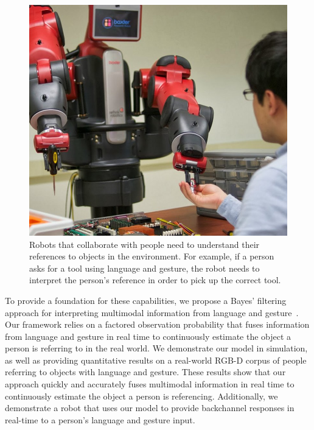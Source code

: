 \documentclass[letterpaper, 10 pt, conference]{ieeeconf}
\begin{document}
\begin{figure}
\centering
\includegraphics[width=1\linewidth]{figures/baxter_scene_cropped.jpg}
\caption{Robots that collaborate with people need to understand their
  references to objects in the environment.  For example, if a person
  asks for a tool using language and gesture, the robot needs to
  interpret the person's reference in order to pick up the correct
  tool.\label{fig:example}}
\end{figure}



To provide a foundation for these capabilities, we propose a Bayes'
filtering approach for interpreting multimodal information from
language and gesture~\citep{thrun08}.  Our framework relies on a
factored observation probability that fuses information from language
and gesture in real time to continuously estimate the object a person
is referring to in the real world.  We demonstrate our model in
simulation, as well as providing quantitative results on a real-world
RGB-D corpus of people referring to objects with language and gesture.
These results show that our approach quickly and accurately fuses
multimodal information in real time to continuously estimate the
object a person is referencing.  Additionally, we demonstrate a robot
that uses our model to provide backchannel responses in real-time to a
person's language and gesture input.
\end{document}
